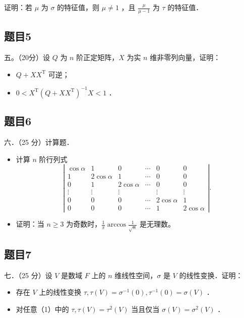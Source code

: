 \documentclass{article}
\begin{document}
证明：若 \(\mu\) 为 \(\sigma\) 的特征值，则 \(\mu \neq 1\) ，且 \(\frac{\mu}{\mu-1}\) 为 \(\tau\) 的特征值．

\subsection{题目5}
五。（20分）设 \(Q\) 为 \(n\) 阶正定矩阵，\(X\) 为实 \(n\) 维非零列向量，证明：

\begin{itemize}
  \item[（1）] \(Q+X X^{\mathrm{T}}\) 可逆；
  \item[（2）] \(0<X^{\mathrm{T}}\left(Q+X X^{\mathrm{T}}\right)^{-1} X<1\) ．
\end{itemize}

\subsection{题目6}
六．（25 分）计算题．

\begin{itemize}
  \item[（1）] 计算 \(n\) 阶行列式
\[
\left|\begin{array}{cccccc}
\cos \alpha & 1 & 0 & \cdots & 0 & 0 \\
1 & 2 \cos \alpha & 1 & \cdots & 0 & 0 \\
0 & 1 & 2 \cos \alpha & \cdots & 0 & 0 \\
\vdots & \vdots & \vdots & & \vdots & \vdots \\
0 & 0 & 0 & \cdots & 2 \cos \alpha & 1 \\
0 & 0 & 0 & \cdots & 1 & 2 \cos \alpha
\end{array}\right| .
\]
  \item[（2）] 证明：当 \(n \geq 3\) 为奇数时，\(\frac{1}{\pi} \arccos \frac{1}{\sqrt{n}}\) 是无理数。
\end{itemize}

\subsection{题目7}
七．（25 分）设 \(V\) 是数域 \(F\) 上的 \(n\) 维线性空间，\(\sigma\) 是 \(V\) 的线性变换．证明：

\begin{itemize}
  \item[（1）] 存在 \(V\) 上的线性变换 \(\tau, \tau(V)=\sigma^{-1}(0), \tau^{-1}(0)=\sigma(V)\) ．
  \item[（2）] 对任意（1）中的 \(\tau, \tau(V)=\tau^{2}(V)\) 当且仅当 \(\sigma(V)=\sigma^{2}(V)\) ．
\end{itemize}
\end{document}
